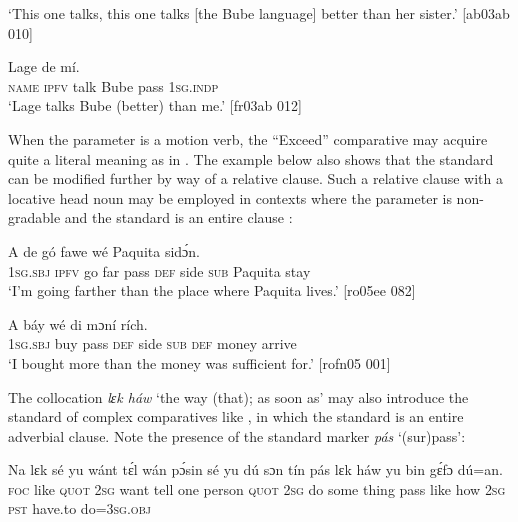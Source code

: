 \glt ‘This one talks, this one talks [the Bube language] 
better than her sister.’ [ab03ab 010]
\z


\ea%
    \label{ex:key:478}
    \gll Lage    de        mí.\\
\textsc{name}  \textsc{ipfv}  talk  Bube  pass  \textsc{1sg.indp}\\

\glt ‘Lage talks Bube (better) than me.’ [fr03ab 012]
\z

When the parameter is a motion verb, the “Exceed” comparative may acquire quite a literal meaning as in . The example below also shows that the standard can be modified further by way of a relative clause. Such a relative clause with a locative head noun may be employed in contexts where the parameter is non-gradable and the standard is an entire clause :


\ea%
    \label{ex:key:479}
    \gll A    de  gó  fawe        wé  Paquita  sidɔ́n.\\
\textsc{1sg.sbj}  \textsc{ipfv}  go  far    pass  \textsc{def}  side  \textsc{sub}  Paquita  stay\\

\glt ‘I’m going farther than the place where Paquita lives.’ [ro05ee 082]
\z


\ea%
    \label{ex:key:480}
    \gll A    báy        wé  di  mɔní  rích.\\
\textsc{1sg.sbj}  buy  pass  \textsc{def}  side  \textsc{sub}  \textsc{def}  money  arrive\\

\glt ‘I bought more than the money was sufficient for.’ [rofn05 001]
\z

The collocation \textit{lɛk háw} ‘the way (that); as soon as’ may also introduce the standard of complex comparatives like , in which the standard is an entire adverbial clause. Note the presence of the standard marker \textit{pás} ‘(sur)pass’: 


\ea%
    \label{ex:key:481}
    \gll Na  lɛk  sé  yu  wánt  tɛ́l  wán  pɔ́sin  sé  yu  dú  sɔn
tín    pás    lɛk  háw    yu  bin  gɛ́fɔ    dú=an.\\
\textsc{foc}  like  \textsc{quot}  \textsc{2sg}  want  tell  one  person  \textsc{quot}  \textsc{2sg}  do  some
thing  pass    like  how    \textsc{2sg}  \textsc{pst}  have.to  do=\textsc{3sg.obj}\\

